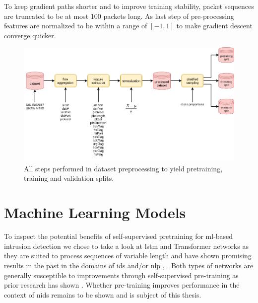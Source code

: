 To keep gradient paths shorter and to improve training stability, packet sequences are truncated to be at most 100 packets long. As last step of pre-processing features are normalized to be within a range of $[-1,1]$ to make gradient descent converge quicker.

\begin{figure}[h]
	\centering
	\includegraphics[width=0.95\linewidth]{graphics/img/dataset_preprocessing.png}
	\caption{All steps performed in dataset preprocessing to yield pretraining, training and validation splits.}
	\label{fig:dataset_preprocessing}
\end{figure}

\section{Machine Learning Models}

To inspect the potential benefits of self-supervised pretraining for \gls{ml}-based intrusion detection we chose to take a look at \gls{lstm} and Transformer networks as they are suited to process sequences of variable length and have shown promising results in the past in the domains of \gls{ids} and/or \gls{nlp} \cite{bert}, \cite{attention_model_ids}. Both types of networks are generally susceptible to improvements through self-supervised pre-training as prior research has shown \cite{bert} \cite{unsupervised_learning_lstms} \cite{unsupervised_learning_lstms_timeseries}. Whether pre-training improves performance in the context of \gls{nids} remains to be shown and is subject of this thesis.

